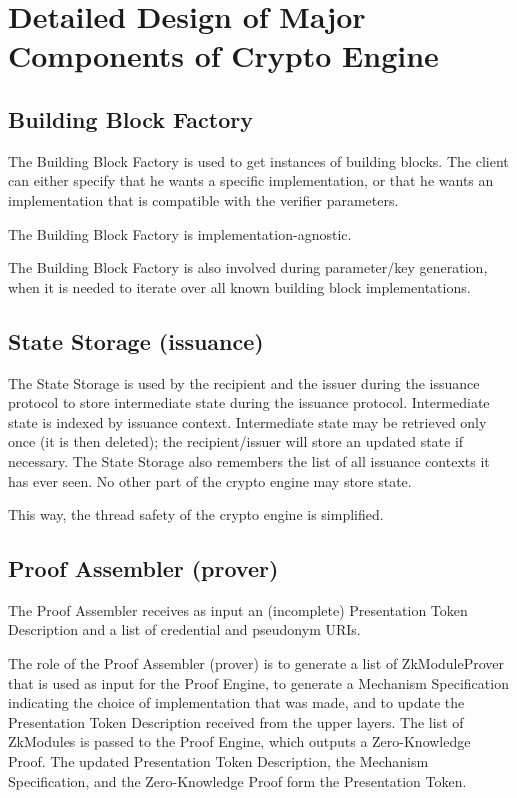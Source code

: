 
\section{Detailed Design of Major Components of Crypto Engine}
  \subsection{Building Block Factory}
    The Building Block Factory is used to get instances of building blocks.
    The client can either specify that he wants a specific implementation, or that he wants
    an implementation that is compatible with the verifier parameters.

    The Building Block Factory is implementation-agnostic.

    The Building Block Factory is also involved during parameter/key generation, when it is needed
    to iterate over all known building block implementations.

  \subsection{State Storage (issuance)}
  The State Storage is used by the recipient and the issuer during the issuance protocol to store
  intermediate state during the issuance protocol.
  Intermediate state is indexed by issuance context.
  Intermediate state may be retrieved only once (it is then deleted); the recipient/issuer will
  store an updated state if necessary.
  The State Storage also remembers the list of all issuance contexts it has ever seen.
  No other part of the crypto engine may store state.

  This way, the thread safety of the crypto engine is simplified.

  \subsection{Proof Assembler (prover)}
    The Proof Assembler receives as input an (incomplete) Presentation Token Description
    and a list of credential and pseudonym URIs.

    The role of the Proof Assembler (prover) is to generate a list of ZkModuleProver
    that is used as input for the Proof Engine, to generate a Mechanism Specification
    indicating the choice of implementation that was made, and to update the Presentation
    Token Description received from the upper layers.
    The list of ZkModules is passed to the Proof Engine, which outputs a Zero-Knowledge
    Proof. The updated Presentation Token Description, the Mechanism Specification, and
    the Zero-Knowledge Proof form the Presentation Token.

